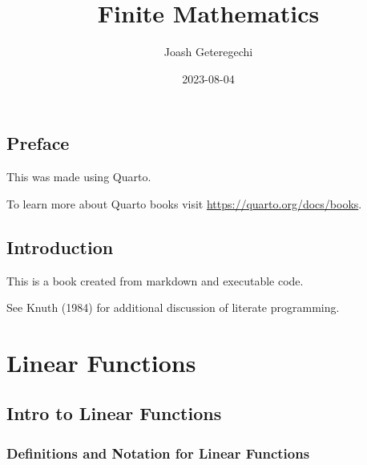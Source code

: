 \documentclass[
  letterpaper,
  DIV=11,
  numbers=noendperiod]{scrreprt}
\title{Finite Mathematics}
\author{Joash Geteregechi}
\date{2023-08-04}
\renewcommand*\contentsname{Table of contents}
\newcommand\contentsname{Table of contents}
\begin{document}
\maketitle
\ifdefined\Shaded\renewenvironment{Shaded}{\begin{tcolorbox}[enhanced, breakable, boxrule=0pt, interior hidden, sharp corners, borderline west={3pt}{0pt}{shadecolor}, frame hidden]}{\end{tcolorbox}}\fi

\renewcommand*\contentsname{Table of contents}
{
\hypersetup{linkcolor=}
\setcounter{tocdepth}{2}
\tableofcontents
}

\hypertarget{preface}{%
\chapter*{Preface}\label{preface}}


This was made using Quarto.

To learn more about Quarto books visit
\url{https://quarto.org/docs/books}.


\hypertarget{introduction}{%
\chapter{Introduction}\label{introduction}}

This is a book created from markdown and executable code.

See Knuth (1984) for additional discussion of literate programming.

\part{Linear Functions}

\hypertarget{intro-to-linear-functions}{%
\chapter{Intro to Linear Functions}\label{intro-to-linear-functions}}

\hypertarget{definitions-and-notation-for-linear-functions}{%
\section{Definitions and Notation for Linear
Functions}\label{definitions-and-notation-for-linear-functions}}
\end{document}
